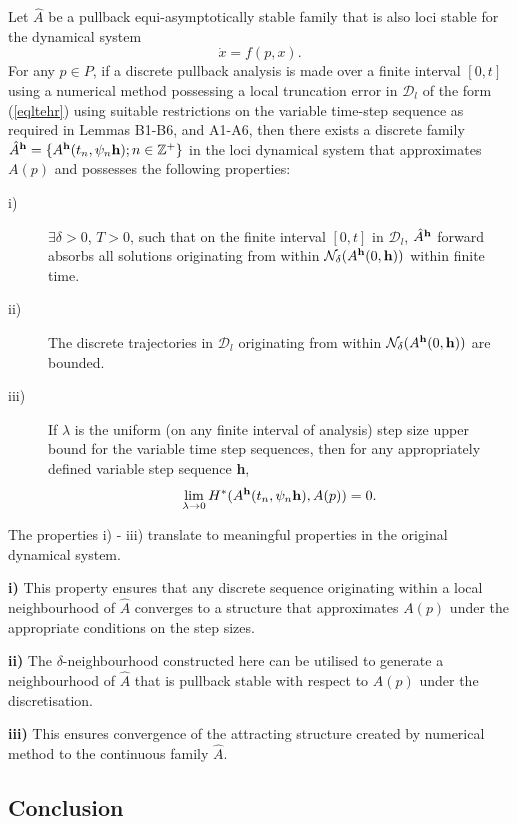 \begin{therm}
Let $\hat{A}$ be a pullback equi-asymptotically stable family that is also loci
stable for the dynamical system
\[ \dot{x} = f(p, x). \]
For any $p \in P$, if a discrete pullback analysis is made over a finite
interval $[0,t]$ using a numerical method possessing a local truncation error
in $\mathcal{D}_l$ of the form (\ref{eqltehr}) using suitable restrictions on
the variable time-step sequence as required in Lemmas B1-B6, and A1-A6, then
there exists a discrete family $\hat{A}^{{\bf h}} = \{ A^{{\bf h}}(t_n, \psi_n
{\bf h}); n \in \mathbb{Z}^+ \}$ in the loci dynamical system that approximates
$A(p)$ and possesses the following properties:
\begin{description}
\item[i)] $\exists \delta> 0$, $T >0$, such that on the finite interval $[0,
  t]$ in $\mathcal{D}_l$, $\hat{A}^{{\bf h}}$ forward absorbs all solutions
  originating from within $\mathcal{N}_{\delta}(A^{{\bf h}}(0, {\bf h}))$ within
  finite time.
\item[ii)] The discrete trajectories in $\mathcal{D}_l$
  originating from within $\mathcal{N}_{\delta}(A^{{\bf h}}(0, {\bf h}))$ are
  bounded.
\item[iii)] If $\lambda$ is the uniform (on any finite interval of
  analysis) step size upper bound for the variable time step sequences, then
  for any appropriately defined variable step sequence {\bf h},
\[ \lim_{\lambda \to 0} H^*( A^{{\bf h}}(t_n, \psi_n {\bf h}), A(p)) = 0. \]
\end{description}
\end{therm}

The properties i) - iii) translate to meaningful properties
in the original dynamical system.

\textbf{i)} This property ensures that any discrete sequence originating within
a local neighbourhood of $\hat{A}$ converges to a structure that approximates
$A(p)$ under the appropriate conditions on the step sizes.

\textbf{ii)} The $\delta$-neighbourhood constructed here can be utilised to
generate a neighbourhood of $\hat{A}$ that is pullback stable with respect to
$A(p)$ under the discretisation.

\textbf{iii)} This ensures convergence of the attracting structure created by
numerical method to the continuous family $\hat{A}$.

\subsection{Conclusion}

